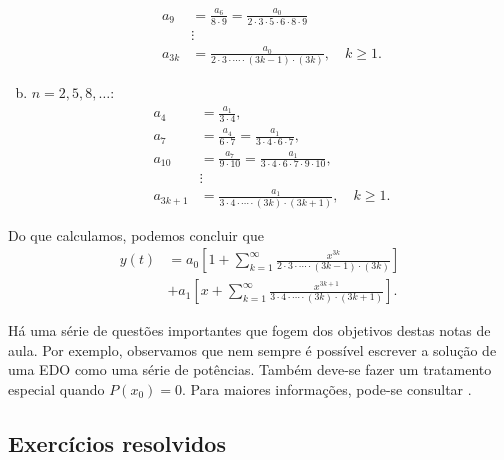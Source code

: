 \begin{ex}
\begin{enumerate}[a)]
\begin{align}
      a_9 &= \frac{a_{6}}{8\cdot 9} = \frac{a_0}{2\cdot 3\cdot 5\cdot 6 \cdot 8 \cdot 9} \\
          &\vdots \\
      a_{3k} &= \frac{a_0}{2\cdot 3 \cdot\cdots\cdot (3k-1)\cdot (3k)},\quad k\geq 1.
    \end{align}
  \item $n = 2, 5, 8, \ldots$:
    \begin{align}
      a_4 &= \frac{a_1}{3\cdot 4}, \\
      a_7 &= \frac{a_4}{6\cdot 7} = \frac{a_1}{3\cdot 4 \cdot 6 \cdot 7},\\
      a_{10} &= \frac{a_{7}}{9\cdot 10} = \frac{a_1}{3\cdot 4 \cdot 6 \cdot 7\cdot 9 \cdot 10},\\
          &\vdots \\
      a_{3k+1} &= \frac{a_1}{3\cdot 4 \cdot\cdots\cdot (3k)\cdot (3k+1)},\quad k\geq 1.
    \end{align}
  \end{enumerate}
  Do que calculamos, podemos concluir que
  \begin{align}
    y(t) &= a_0\left[1 + \sum_{k=1}^\infty \frac{x^{3k}}{2\cdot 3 \cdot\cdots\cdot (3k-1)\cdot (3k)}\right] \\
         &+ a_1\left[x + \sum_{k=1}^\infty \frac{x^{3k+1}}{3\cdot 4 \cdot\cdots\cdot (3k)\cdot (3k+1)}\right].
  \end{align}
\end{ex}

Há uma série de questões importantes que fogem dos objetivos destas notas de aula. Por exemplo, observamos que nem sempre é possível escrever a solução de uma EDO como uma série de potências. Também deve-se fazer um tratamento especial quando $P(x_0)=0$. Para maiores informações, pode-se consultar \cite{Boyce2017}.

\subsection*{Exercícios resolvidos}


